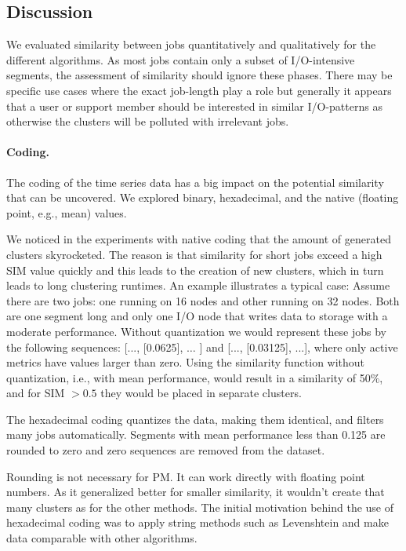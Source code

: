 \documentclass{jhps}
\begin{document}
\FloatBarrier
\subsection{Discussion}
We evaluated similarity between jobs quantitatively and qualitatively for the different algorithms.
As most jobs contain only a subset of I/O-intensive segments, the assessment of similarity should ignore these phases.
There may be specific use cases where the exact job-length play a role but generally it appears that a user or support member should be interested in similar I/O-patterns as otherwise the clusters will be polluted with  irrelevant jobs.

\paragraph{Coding.} The coding of the time series data has a big impact on the potential similarity that can be uncovered.
We explored binary, hexadecimal, and the native (floating point, e.g., mean) values.

We noticed in the experiments with native coding that the amount of generated clusters skyrocketed.
The reason is that similarity for short jobs exceed a high SIM value quickly and this leads to the creation of new clusters, which in turn leads to long clustering runtimes.
An example illustrates a typical case:
Assume there are two jobs: one running on 16 nodes and other running on 32 nodes.
Both are one segment long and only one I/O node that writes data to storage with a moderate performance.
Without quantization we would represent these jobs by the following sequences:  [..., [0.0625], $ \ldots $ ] and [..., [0.03125], ...], where only active metrics have values larger than zero.
Using the similarity function without quantization, i.e., with mean performance, would result in a similarity of 50$\%$, and for SIM $>0.5$ they would be placed in separate clusters.

The hexadecimal coding quantizes the data, making them identical, and filters many jobs automatically.
Segments with mean performance less than 0.125 are rounded to zero and zero sequences are removed from the dataset.

Rounding is not necessary for PM.
It can work directly with floating point numbers.
As it generalized better for smaller similarity, it wouldn't create that many clusters as for the other methods.
The initial motivation behind the use of hexadecimal coding was to apply string methods such as Levenshtein and make data comparable with other algorithms.
\end{document}
